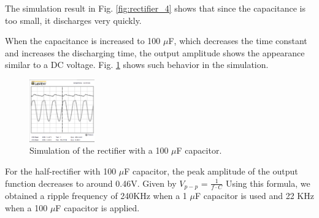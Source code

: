 \documentclass[letterpaper, 10 pt, conference]{ieeeconf}  %
\begin{document}
\par The simulation result in Fig. \ref{fig:rectifier_4} shows that since the
capacitance is too small, it discharges very quickly.
\par When the capacitance is increased to 100 $\mu$F, which decreases the time
constant and increases the discharging time, the output amplitude shows the appearance
similar to a DC voltage. Fig. \ref{fig:rectifier_5} shows such behavior in the simulation.
\begin{figure}[h]
  \centering
  \includegraphics[width=0.25\textwidth]{images/halfwave_100miuf.png}
  \caption{Simulation of the rectifier with a 100 $\mu$F capacitor.}
  \label{fig:rectifier_5}
\end{figure}
\par For the half-rectifier with 100 $\mu$F capacitor, the peak amplitude of
the output function decreases to around 0.46V. Given by $V_{p-p}$ = $\frac {1}{f \cdot C}$
Using this formula, we obtained a ripple frequency of 240KHz when a 1 $\mu$F
capacitor is used and 22 KHz when a 100 $\mu$F capacitor is applied.
\end{document}
